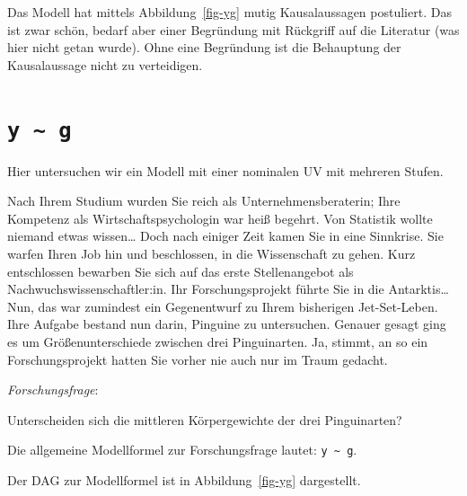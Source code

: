 \documentclass[
  ngerman,
  letterpaper,
  twoside,
  open=any]{scrbook}
\theoremstyle{definition}
\theoremstyle{plain}
\theoremstyle{definition}
\theoremstyle{definition}
\theoremstyle{definition}
\theoremstyle{definition}
\theoremstyle{remark}
\begin{document}
\begin{tcolorbox}[enhanced jigsaw, arc=.35mm, bottomrule=.15mm, bottomtitle=1mm, breakable, colback=white, colbacktitle=quarto-callout-important-color!10!white, colframe=quarto-callout-important-color-frame, coltitle=black, left=2mm, leftrule=.75mm, opacityback=0, opacitybacktitle=0.6, rightrule=.15mm, title=\textcolor{quarto-callout-important-color}{\faExclamation}\hspace{0.5em}{Wichtig}, titlerule=0mm, toprule=.15mm, toptitle=1mm]

Das Modell hat mittels Abbildung~\ref{fig-yg} mutig Kausalaussagen
postuliert. Das ist zwar schön, bedarf aber einer Begründung mit
Rückgriff auf die Literatur (was hier nicht getan wurde). Ohne eine
Begründung ist die Behauptung der Kausalaussage nicht zu verteidigen.

\end{tcolorbox}

\section{\texorpdfstring{\texttt{y\ \textasciitilde{}\ g}}{y \textasciitilde{} g}}\label{sec-yg}

Hier untersuchen wir ein Modell mit einer nominalen UV mit mehreren
Stufen.

Nach Ihrem Studium wurden Sie reich als Unternehmensberaterin; Ihre
Kompetenz als Wirtschaftspsychologin war heiß begehrt. Von Statistik
wollte niemand etwas wissen\ldots{} Doch nach einiger Zeit kamen Sie in
eine Sinnkrise. Sie warfen Ihren Job hin und beschlossen, in die
Wissenschaft zu gehen. Kurz entschlossen bewarben Sie sich auf das erste
Stellenangebot als Nachwuchswissenschaftler:in. Ihr Forschungsprojekt
führte Sie in die Antarktis\ldots{} Nun, das war zumindest ein
Gegenentwurf zu Ihrem bisherigen Jet-Set-Leben. Ihre Aufgabe bestand nun
darin, Pinguine zu untersuchen. Genauer gesagt ging es um
Größenunterschiede zwischen drei Pinguinarten. Ja, stimmt, an so ein
Forschungsprojekt hatten Sie vorher nie auch nur im Traum gedacht.

\emph{Forschungsfrage}:

\begin{displayquote}
Unterscheiden sich die mittleren Körpergewichte der drei Pinguinarten?
\end{displayquote}

Die allgemeine Modellformel zur Forschungsfrage lautet:
\texttt{y\ \textasciitilde{}\ g}.

Der DAG zur Modellformel ist in Abbildung~\ref{fig-yg} dargestellt.
\end{document}
